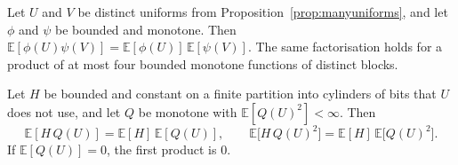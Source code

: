 \begin{propositionx}\label{prop:indepproduct}
Let $U$ and $V$ be distinct uniforms from Proposition~\ref{prop:manyuniforms}, and let $\phi$ and $\psi$ be bounded and monotone. Then $\mathbb E[\phi(U)\psi(V)]=\mathbb E[\phi(U)]\,\mathbb E[\psi(V)]$. The same factorisation holds for a product of at most four bounded monotone functions of distinct blocks.

Let $H$ be bounded and constant on a finite partition into cylinders of bits that $U$ does not use, and let $Q$ be monotone with $\mathbb E[Q(U)^2]<\infty$. Then
\[
 \mathbb E[H\,Q(U)]=\mathbb E[H]\,\mathbb E[Q(U)],\qquad
 \mathbb E\bigl[H\,Q(U)^2\bigr]=\mathbb E[H]\,\mathbb E\bigl[Q(U)^2\bigr].
\]
If $\mathbb E[Q(U)]=0$, the first product is $0$.
\end{propositionx}
